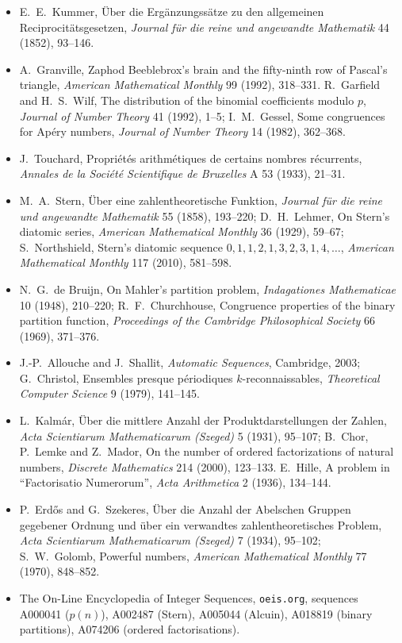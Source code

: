 \begin{itemize}
\item E.~E.~Kummer, Über die Ergänzungssätze zu den allgemeinen Reciprocitätsgesetzen, \emph{Journal für die reine und angewandte
Mathematik} 44 (1852), 93--146.
\item A.~Granville, Zaphod Beeblebrox's brain and the fifty-ninth row of Pascal's triangle, \emph{American Mathematical Monthly} 99
(1992), 318--331. R.~Garfield and H.~S.~Wilf, The distribution of the binomial coefficients modulo $p$, \emph{Journal of Number Theory}
41 (1992), 1--5; I.~M.~Gessel, Some congruences for Apéry numbers, \emph{Journal of Number Theory} 14 (1982), 362--368.
\item J.~Touchard, Propriétés arithmétiques de certains nombres récurrents, \emph{Annales de la Société Scientifique de Bruxelles}
A 53 (1933), 21--31.
\item M.~A.~Stern, Über eine zahlentheoretische Funktion, \emph{Journal für die reine und angewandte Mathematik} 55 (1858),
193--220; D.~H.~Lehmer, On Stern's diatomic series, \emph{American Mathematical Monthly} 36 (1929), 59--67; S.~Northshield, Stern's
diatomic sequence $0,1,1,2,1,3,2,3,1,4,\dots$, \emph{American Mathematical Monthly} 117 (2010), 581--598.
\item N.~G.~de Bruijn, On Mahler's partition problem, \emph{Indagationes Mathematicae} 10 (1948), 210--220; R.~F.~Churchhouse,
Congruence properties of the binary partition function, \emph{Proceedings of the Cambridge Philosophical Society} 66 (1969),
371--376.
\item J.-P.~Allouche and J.~Shallit, \emph{Automatic Sequences}, Cambridge, 2003; G.~Christol, Ensembles presque périodiques
$k$-reconnaissables, \emph{Theoretical Computer Science} 9 (1979), 141--145.
\item L.~Kalmár, Über die mittlere Anzahl der Produktdarstellungen der Zahlen, \emph{Acta Scientiarum Mathematicarum (Szeged)} 5
(1931), 95--107; B.~Chor, P.~Lemke and Z.~Mador, On the number of ordered factorizations of natural numbers, \emph{Discrete
Mathematics} 214 (2000), 123--133. E.~Hille, A problem in ``Factorisatio Numerorum'', \emph{Acta Arithmetica} 2 (1936), 134--144.
\item P.~Erdős and G.~Szekeres, Über die Anzahl der Abelschen Gruppen gegebener Ordnung und über ein verwandtes
zahlentheoretisches Problem, \emph{Acta Scientiarum Mathematicarum (Szeged)} 7 (1934), 95--102; S.~W.~Golomb, Powerful numbers,
\emph{American Mathematical Monthly} 77 (1970), 848--852.
\item The On-Line Encyclopedia of Integer Sequences, \texttt{oeis.org}, sequences A000041 ($p(n)$), A002487 (Stern), A005044
(Alcuin), A018819 (binary partitions), A074206 (ordered factorisations).
\end{itemize}
